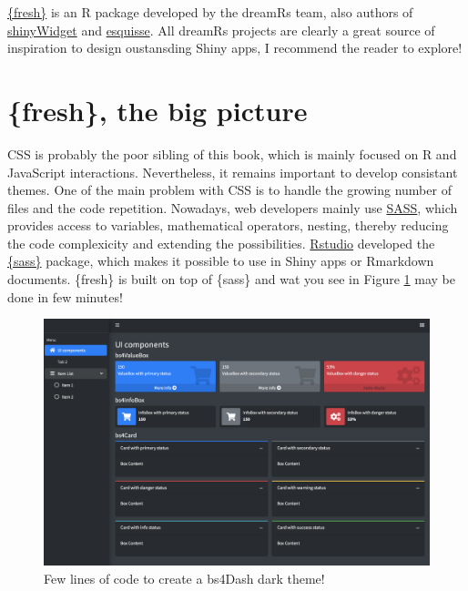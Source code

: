 \documentclass[]{book}
\begin{document}
\href{https://github.com/dreamRs/fresh}{\{fresh\}} is an R package developed by the dreamRs team, also authors of \href{https://github.com/dreamRs/shinyWidgets}{shinyWidget} and \href{https://github.com/dreamRs/esquisse}{esquisse}. All dreamRs projects are clearly a great source of inspiration to design oustansding Shiny apps, I recommend the reader to explore!

\hypertarget{fresh-the-big-picture}{%
\section{\{fresh\}, the big picture}\label{fresh-the-big-picture}}

CSS is probably the poor sibling of this book, which is mainly focused on R and JavaScript interactions. Nevertheless, it remains important to develop consistant themes. One of the main problem with CSS is to handle the growing number of files and the code repetition. Nowadays, web developers mainly use \href{https://sass-lang.com/guide}{SASS}, which provides access to variables, mathematical operators, nesting, thereby reducing the code complexicity and extending the possibilities. \href{https://rstudio.com}{Rstudio} developed the \href{https://rstudio.github.io/sass/articles/sass.html}{\{sass\}} package, which makes it possible to use in Shiny apps or Rmarkdown documents. \{fresh\} is built on top of \{sass\} and wat you see in Figure \ref{fig:bs4Dash-fresh} may be done in few minutes!

\begin{figure}
\includegraphics[width=34.22in]{images/beautify/bs4Dash-fresh} \caption{Few lines of code to create a bs4Dash dark theme!}\label{fig:bs4Dash-fresh}
\end{figure}
\end{document}
